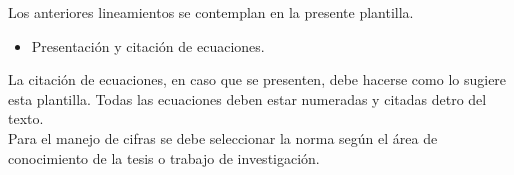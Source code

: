 Los anteriores lineamientos se contemplan en la presente plantilla.\\

\begin{itemize}
\item Presentaci\'{o}n y citaci\'{o}n de ecuaciones.
\end{itemize}

La citaci\'{o}n de ecuaciones, en caso que se presenten, debe hacerse como lo sugiere esta plantilla. Todas las ecuaciones deben estar numeradas y citadas detro del texto.\\

Para el manejo de cifras se debe seleccionar la norma seg\'{u}n el \'{a}rea de conocimiento de la tesis  o trabajo de investigaci\'{o}n.\\
